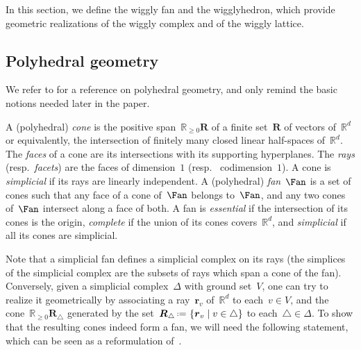 \documentclass{amsart}
\theoremstyle{definition}
\newcommand{\R}{\mathbb{R}} %
\renewcommand{\b}[1]{{\boldsymbol{#1}}} %
\newcommand{\set}[2]{\left\{ #1 \;\middle|\; #2 \right\}} %
\newcommand{\eqdef}{\mbox{\,\raisebox{0.2ex}{\scriptsize\ensuremath{\mathrm:}}\ensuremath{=}\,}} %
\newcommand{\darkblue}{\color{darkblue}} %
\newcommand{\defn}[1]{\textsl{\darkblue #1}} %
\begin{document}
In this section, we define the wiggly fan and the wigglyhedron, which provide geometric realizations of the wiggly complex and of the wiggly lattice.


\subsection{Polyhedral geometry}
\label{subsec:polyhedralGeometry}

We refer to \cite{Ziegler-polytopes} for a reference on polyhedral geometry, and only remind the basic notions needed later in the paper.

A (polyhedral) \defn{cone} is the positive span~$\R_{\ge 0}\b{R}$ of a finite set~$\b{R}$ of vectors of~$\R^d$ or equivalently, the intersection of finitely many closed linear half-spaces of~$\R^d.$ 
The \defn{faces} of a cone are its intersections with its supporting hyperplanes. 
The \defn{rays} (resp.~\defn{facets}) are the faces of dimension~$1$ (resp.~ codimension~$1$).
A cone is \defn{simplicial} if its rays are linearly independent.
A (polyhedral) \defn{fan}~$\Fan$ is a set of cones such that any face of a cone of~$\Fan$ belongs to~$\Fan$, and any two cones of~$\Fan$ intersect along a face of both. 
A fan is \defn{essential} if the intersection of its cones is the origin, \defn{complete} if the union of its cones covers~$\R^d$, and \defn{simplicial} if all its cones are simplicial.

Note that a simplicial fan defines a simplicial complex on its rays (the simplices of the simplicial complex are the subsets of rays which span a cone of the fan).
Conversely, given a simplicial complex~$\Delta$ with ground set~$V$, one can try to realize it geometrically by associating a ray~$\b{r}_v$ of~$\R^d$ to each~$v \in V$, and the cone~$\R_{\ge 0}\b{R}_\triangle$ generated by the set~$\b{R}_\triangle \eqdef \set{\b{r}_v}{v \in \triangle}$ to each~$\triangle \in \Delta$.
To show that the resulting cones indeed form a fan, we will need the following statement, which can be seen as a reformulation of~\cite[Coro.~4.5.20]{DeLoeraRambauSantos}.
\end{document}
